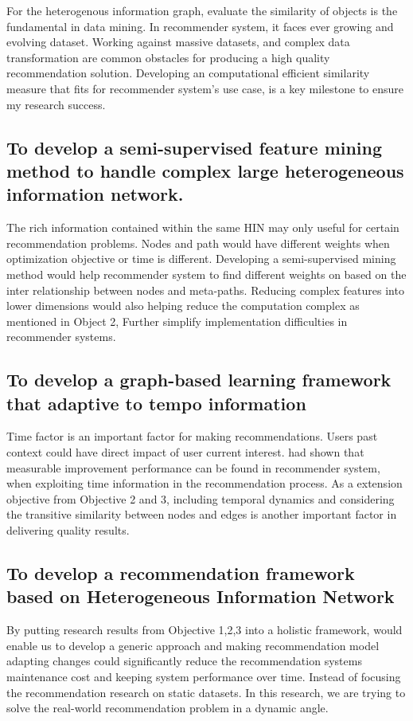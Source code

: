 For the heterogenous information graph, evaluate the similarity of objects is the fundamental in data mining. In recommender system, it faces ever growing and evolving dataset. Working against massive datasets, and complex data transformation are common obstacles for producing a high quality recommendation solution. Developing an computational efficient similarity measure that fits for recommender system's use case, is a key milestone to ensure my research success.

\subsection{To develop a semi-supervised feature mining method to handle complex large heterogeneous information network.}

The rich information contained within the same HIN may only useful for certain recommendation problems. Nodes and path would have different weights when optimization objective or time is different. Developing a semi-supervised mining method would help recommender system to find different weights on based on the inter relationship between nodes and meta-paths. Reducing complex features into lower dimensions would also helping reduce the computation complex \citep{Cai2018} as mentioned in Object 2, Further simplify implementation difficulties in recommender systems. 

\subsection{To develop a graph-based learning framework that adaptive to tempo information}

Time factor is an important factor for making recommendations. Users past context could have direct impact of user current interest. \citet{Song2019} had shown that measurable improvement performance can be found in recommender system, when exploiting time information in the recommendation process. As a extension objective from Objective 2 and 3, including temporal dynamics and considering the transitive similarity between nodes and edges is another important factor in delivering quality results.

\subsection{To develop a recommendation framework based on Heterogeneous Information Network} 

By putting research results from Objective 1,2,3 into a holistic framework, would enable us to develop a generic approach and making recommendation model adapting changes could significantly reduce the recommendation systems maintenance cost and keeping system performance over time. 
Instead of focusing the recommendation research on static datasets. In this research, we are trying to solve the real-world recommendation problem in a dynamic angle.

